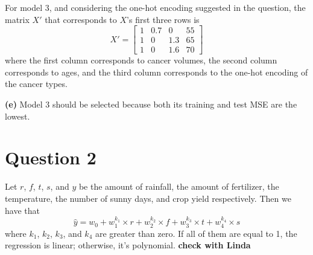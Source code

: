 \documentclass[leqno]{article}
\begin{document}
For model 3, and considering the one-hot encoding suggested in the question, the matrix $X'$ that corresponds to $X$'s first three rows is
\[
X'=
  \begin{bmatrix}
    1 & 0.7 & 0 & 55\\
    1 & 0 & 1.3 & 65 \\
    1 & 0 & 1.6 & 70
  \end{bmatrix}
\]
where the first column corresponds to cancer volumes, the second column corresponds to ages, and the third column corresponds to the one-hot encoding 
of the cancer types.

\hfill

\textbf{(e)} Model 3 should be selected because both its training and test MSE are the lowest.


\hfill

\section*{Question 2} Let $r$, $f$, $t$, $s$, and $y$ be the amount of rainfall, the amount of fertilizer, the temperature, the number of sunny days, and 
crop yield respectively. Then we have that
\begin{equation*}
\hat{y} = w_0 + w_1^{k_1} \times r + w_2^{k_2} \times f + w_3^{k_3} \times t + w_4^{k_4} \times s
\end{equation*}
where $k_1$, $k_2$, $k_3$, and $k_4$ are greater than zero. If all of them are equal to 1, the regression is linear; otherwise, it's polynomial.
\textbf{check with Linda}
\end{document}
